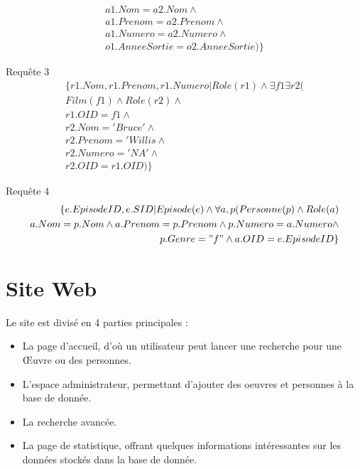 \documentclass[10pt,a4paper]{article}
\begin{document}
\begin{list}{*}{}
\[\begin{aligned}
       a1.Nom = a2.Nom \wedge \\
       a1.Prenom = a2.Prenom \wedge \\
       a1.Numero = a2.Numero \wedge \\
       o1.AnneeSortie = o2.AnneeSortie) \}
\end{aligned}\]
\item Requête 3
\noindent
\[\begin{aligned}
\{r1.Nom, r1.Prenom, r1.Numero | Role(r1) \wedge \exists f1 \exists r2 (\\
	Film(f1) \wedge Role(r2) \wedge \\
    r1.OID = f1 \wedge \\
    r2.Nom = 'Bruce' \wedge \\
    r2.Prenom = 'Willis \wedge \\
    r2.Numero = 'NA' \wedge \\
    r2.OID = r1.OID) \}
\end{aligned}\]


\item Requête 4
\noindent
\[\begin{aligned}
\{e.EpisodeID, e.SID | Episode(e) \wedge \forall a, p (Personne(p) \wedge Role(a) \\
 	   a.Nom  = p.Nom \wedge a.Prenom = p.Prenom \wedge p.Numero = a.Numero \wedge \\
       p.Genre = "f" \wedge a.OID = e.EpisodeID \}
\end{aligned}\]
\end{list}

\newpage
\section{Site Web}

Le site est divisé en 4 parties principales : 
\vskip 3pt
\begin{itemize}
\item La page d’accueil, d'où un utilisateur peut lancer une recherche pour une Œuvre ou des personnes.
\item L'espace administrateur, permettant d'ajouter des oeuvres et personnes à la base de donnée.
\item La recherche avancée.
\item La page de statistique, offrant quelques informations intéressantes sur les données stockés dans la base de donnée.
\end{itemize}
\end{document}
